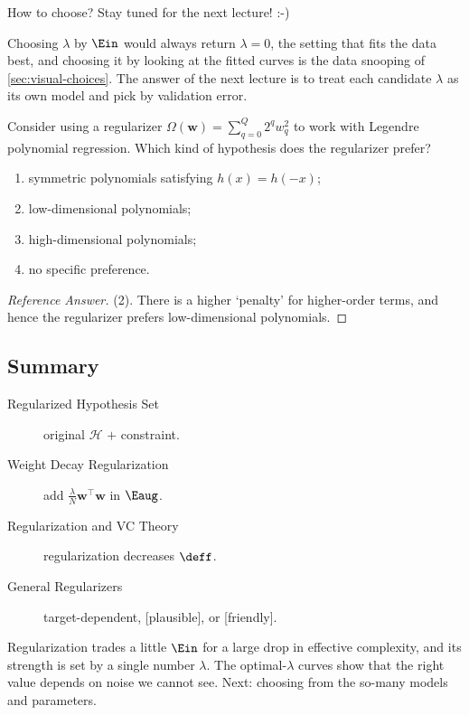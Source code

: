\begin{question}
    How to choose? Stay tuned for the next lecture! :-)
\end{question}

Choosing \(\lambda\) by \(\Ein\) would always return \(\lambda = 0\), the
setting that fits the data best, and choosing it by looking at the fitted
curves is the data snooping of \autoref{sec:visual-choices}. The answer of the
next lecture is to treat each candidate \(\lambda\) as its own model and pick
by validation error.

\begin{exercise}
    Consider using a regularizer \(\Omega(\bm{w}) = \sum_{q=0}^{Q} 2^q w_q^2\)
    to work with Legendre polynomial regression. Which kind of hypothesis
    does the regularizer prefer?
    \begin{enumerate}[(1)]
        \item symmetric polynomials satisfying \(h(x) = h(-x)\);
        \item low-dimensional polynomials;
        \item high-dimensional polynomials;
        \item no specific preference.
    \end{enumerate}
\end{exercise}

\begin{proof}[Reference Answer]
    (2). There is a higher `penalty' for higher-order terms, and hence the
    regularizer prefers low-dimensional polynomials.
\end{proof}

\hrulebar

\subsection*{Summary}

\begin{description}
    \item[Regularized Hypothesis Set] original \(\mathcal{H}\) \(+\)
        constraint.
    \item[Weight Decay Regularization] add \(\frac{\lambda}{N} \bm{w}^\top
        \bm{w}\) in \(\Eaug\).
    \item[Regularization and VC Theory] regularization decreases \(\deff\).
    \item[General Regularizers] target-dependent, [plausible], or [friendly].
\end{description}

Regularization trades a little \(\Ein\) for a large drop in effective
complexity, and its strength is set by a single number \(\lambda\). The
optimal-\(\lambda\) curves show that the right value depends on noise we
cannot see. Next: choosing from the so-many models and parameters.
